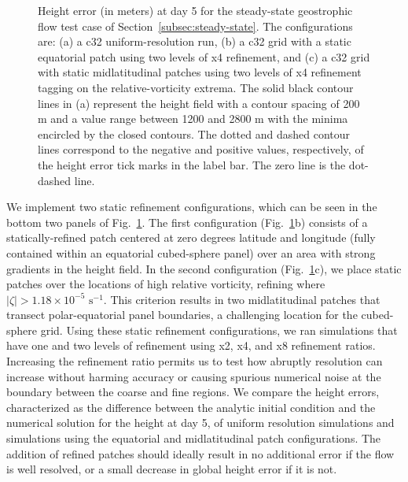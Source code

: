 \begin{figure}
    \caption{Height error (in meters) at day 5 for the steady-state
    geostrophic flow test case of
Section~\ref{subsec:steady-state}.
  The configurations are:  (a) a c32 uniform-resolution run, (b)
    a c32 grid with a static equatorial patch using two levels of x4 refinement,
    and (c) a c32 grid with static midlatitudinal patches using two levels of
    x4 refinement tagging on the relative-vorticity extrema.  The solid
    black contour lines in (a) represent the height field with a contour
    spacing of 200 m and a value range between 1200 and 2800 m with the minima encircled by the closed contours.  The
    dotted and dashed contour lines correspond to the negative and
    positive values, respectively, of the height error tick marks in the
    label bar.  The zero line is the dot-dashed line.  }%
    \label{fig:test2herrplots}
\end{figure}
%
We implement two static refinement configurations, which can be seen in
the bottom two panels of 
Fig.~\ref{fig:test2herrplots}.  The first configuration
(Fig.~\ref{fig:test2herrplots}b) consists of a statically-refined patch centered
at zero degrees latitude and longitude (fully contained within an equatorial cubed-sphere panel)
over an area with strong gradients in the height field.  In the second
configuration
(Fig.~\ref{fig:test2herrplots}c), we place static patches over the locations
of high relative vorticity, refining where 
$| \zeta | > 1.18 \times 10^{-5} \textrm{ s}^{-1}$.  
This criterion results in two midlatitudinal
patches that transect polar-equatorial panel boundaries, a challenging
location for the cubed-sphere grid.  Using these static refinement
configurations, we ran simulations that have one and two levels of
refinement using x2, x4, and x8 refinement ratios.  Increasing the
refinement ratio permits us to test how abruptly resolution can increase
without harming accuracy or causing spurious numerical noise at the
boundary between the coarse and fine regions.  We compare the height
errors, characterized as the difference between the analytic initial
condition and the numerical solution for the height at day 5, of uniform
resolution simulations and simulations using the equatorial and
midlatitudinal patch configurations.  The addition of refined patches
should ideally result in no additional error if the flow is well
resolved, or a small decrease in global height error if it is not.
%
